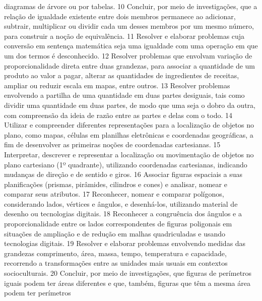 {{{{{							diagramas de árvore ou por tabelas.
						}
						{10}{%
							Concluir, por meio de investigações, que a relação de igualdade existente
							entre dois membros permanece ao adicionar, subtrair, multiplicar ou dividir cada um desses
							membros por um mesmo número, para construir a noção de equivalência.
						}
						{11}{%
							Resolver e elaborar problemas cuja conversão em sentença matemática seja uma
							igualdade com uma operação em que um dos termos é desconhecido.
						}
						{12}{%
							Resolver problemas que envolvam variação de proporcionalidade direta entre
							duas grandezas, para associar a quantidade de um produto ao valor a pagar, alterar as
							quantidades de ingredientes de receitas, ampliar ou reduzir escala em mapas, entre outros.
						}
						{13}{%
							Resolver problemas envolvendo a partilha de uma quantidade em duas partes
							desiguais, tais como dividir uma quantidade em duas partes, de modo que uma seja o dobro
							da outra, com compreensão da ideia de razão entre as partes e delas com o todo.
						}
						{14}{%
							Utilizar e compreender diferentes representações para a localização de objetos
							no plano, como mapas, células em planilhas eletrônicas e coordenadas geográficas, a fim de
							desenvolver as primeiras noções de coordenadas cartesianas.
						}
						{15}{%
							Interpretar, descrever e representar a localização ou movimentação de objetos no
							plano cartesiano (1º quadrante), utilizando coordenadas cartesianas, indicando mudanças de
							direção e de sentido e giros.
						}
						{16}{%
							Associar figuras espaciais a suas planificações (prismas, pirâmides, cilindros e
							cones) e analisar, nomear e comparar seus atributos.
						}
						{17}{%
							Reconhecer, nomear e comparar polígonos, considerando lados, vértices e
							ângulos, e desenhá-los, utilizando material de desenho ou tecnologias digitais.
						}
						{18}{%
							Reconhecer a congruência dos ângulos e a proporcionalidade entre os lados
							correspondentes de figuras poligonais em situações de ampliação e de redução em malhas
							quadriculadas e usando tecnologias digitais.
						}
						{19}{%
							Resolver e elaborar problemas envolvendo medidas das grandezas comprimento,
							área, massa, tempo, temperatura e capacidade, recorrendo a transformações entre as unidades
							mais usuais em contextos socioculturais.
						}
						{20}{%
							Concluir, por meio de investigações, que figuras de perímetros iguais podem
							ter áreas diferentes e que, também, figuras que têm a mesma área podem ter perímetros
}}}}}
